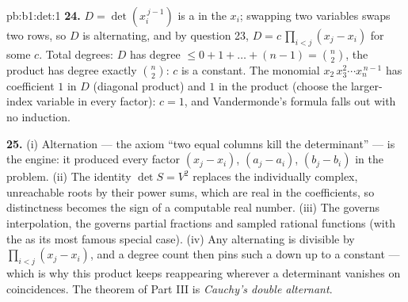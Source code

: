 \begin{solution}{pb:b1:det:1}
\textbf{24.} $D = \det(x_i^{\,j-1})$ is a  in the
$x_i$; swapping two variables swaps two rows, so $D$ is
alternating, and by question 23, $D = c\,\prod_{i<j}(x_j - x_i)$
for some  $c$. Total degrees: $D$ has degree $\leq 0 +
1 + \dots + (n-1) = \binom n2$, the product has degree exactly
$\binom n2$: $c$ is a constant. The monomial $x_2\,x_3^2\cdots
x_n^{\,n-1}$ has coefficient $1$ in $D$ (diagonal product) and
$1$ in the product (choose the larger-index variable in every
factor): $c = 1$, and Vandermonde's formula falls out with no
induction.

\textbf{25.} (i) Alternation --- the axiom ``two equal columns
kill the determinant'' --- is the engine: it produced every
factor $(x_j - x_i)$, $(a_j - a_i)$, $(b_j - b_i)$ in the
problem. (ii) The identity $\det S = V^2$ replaces the
individually complex, unreachable roots by their power sums,
which are real  in the coefficients, so distinctness
becomes the sign of a computable real number. (iii) The
 governs  interpolation, the
 governs partial fractions and sampled
rational functions (with the  as its most famous
special case). (iv) Any alternating  is divisible by
$\prod_{i<j}(x_j - x_i)$, and a degree count then pins such a
 down up to a constant --- which is why this product
keeps reappearing wherever a determinant vanishes on
coincidences. The theorem of Part III is \emph{Cauchy's double
alternant}.
\end{solution}
